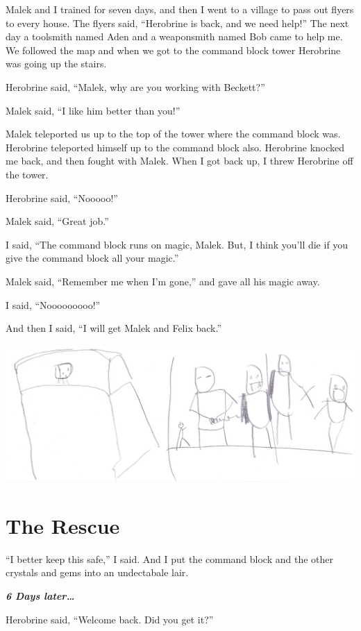 \documentclass[oneside]{book}
\begin{document}
Malek and I trained for seven days, and then I went to a village to pass
out flyers to every house. The flyers said, ``Herobrine is back, and we
need help!'' The next day a toolsmith named Aden and a weaponsmith named
Bob came to help me. We followed the map and when we got to the command
block tower Herobrine was going up the stairs.

Herobrine said, ``Malek, why are you working with Beckett?''

Malek said, ``I like him better than you!''

Malek teleported us up to the top of the tower where the command block
was. Herobrine teleported himself up to the command block also.
Herobrine knocked me back, and then fought with Malek. When I got back
up, I threw Herobrine off the tower.

Herobrine said, ``Nooooo!''

Malek said, ``Great job.''

I said, ``The command block runs on magic, Malek. But, I think you'll
die if you give the command block all your magic.''

Malek said, ``Remember me when I'm gone,'' and gave all his magic away.

I said, ``Nooooooooo!''

And then I said, ``I will get Malek and Felix back.''

\includegraphics[width=6.25000in]{img/nooooo.jpg}

\chapter{The Rescue}\label{the-rescue}

``I better keep this safe,'' I said. And I put the command block and the
other crystals and gems into an undectabale lair.

\textbf{\emph{6 Days later\ldots{}}}

Herobrine said, ``Welcome back. Did you get it?''
\end{document}
